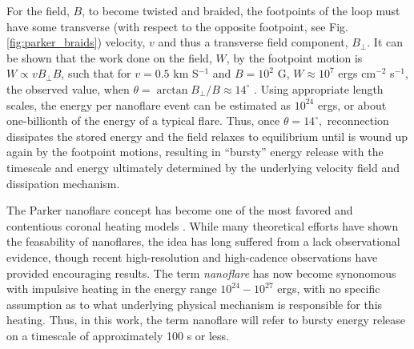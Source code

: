 %
\par For the field, $B$, to become twisted and braided, the footpoints of the loop must have some transverse (with respect to the opposite footpoint, see Fig. \ref{fig:parker_braids}) velocity, $v$ and thus a transverse field component, $B_{\perp}$. It can be shown that the work done on the field, $W$, by the footpoint motion is $W\propto vB_{\perp}B$, such that for $v=0.5$ km S$^{-1}$ and $B=10^2$ G, $W\approx10^7$ ergs cm$^{-2}$ s$^{-1}$, the observed value, when $\theta=\arctan{B_{\perp}/B}\approx14^{\circ}$ \citep{parker_nanoflares_1988}. Using appropriate length scales, the energy per nanoflare event can be estimated as $10^{24}$ ergs, or about one-billionth of the energy of a typical flare. Thus, once $\theta=14^{\circ},$ reconnection dissipates the stored energy and the field relaxes to equilibrium until is wound up again by the footpoint motions, resulting in ``bursty'' energy release with the timescale and energy ultimately determined by the underlying velocity field and dissipation mechanism.
%
\par The Parker nanoflare concept has become one of the most favored and contentious coronal heating models \citep{cargill_implications_1994,cargill_nanoflare_2004,klimchuk_solving_2006}. While many theoretical efforts \citep[e.g.][]{bradshaw_diagnosing_2012,reep_diagnosing_2013} have shown the feasability of nanoflares, the idea has long suffered from a lack observational evidence, though recent high-resolution and high-cadence observations \citep{brosius_pervasive_2014,testa_observing_2013,testa_evidence_2014} have provided encouraging results. The term \textit{nanoflare} has now become synonomous with impulsive heating in the energy range $10^{24}-10^{27}$ ergs, with no specific assumption as to what underlying physical mechanism is responsible for this heating. Thus, in this work, the term nanoflare will refer to bursty energy release on a timescale of approximately 100 s or less.  

%
